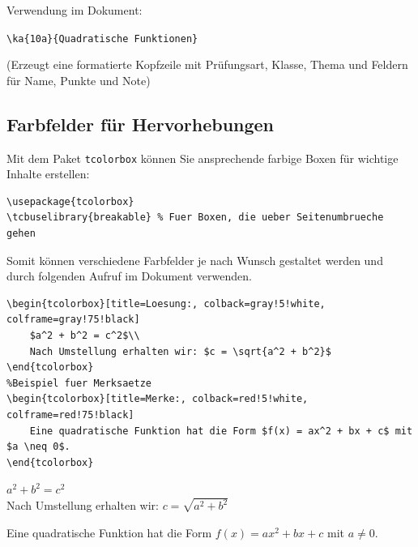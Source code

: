 \begin{ausgabe}
Verwendung im Dokument:

\verb|\ka{10a}{Quadratische Funktionen}|


(Erzeugt eine formatierte Kopfzeile mit Prüfungsart, Klasse, Thema und Feldern für Name, Punkte und Note)
\end{ausgabe}



\subsection{Farbfelder für Hervorhebungen}

Mit dem Paket \texttt{tcolorbox} können Sie ansprechende farbige Boxen für wichtige Inhalte erstellen:

\begin{lstlisting}[style=latex]
\usepackage{tcolorbox}
\tcbuselibrary{breakable} % Fuer Boxen, die ueber Seitenumbrueche gehen
\end{lstlisting}

Somit können verschiedene Farbfelder je nach Wunsch gestaltet werden und durch folgenden Aufruf im Dokument verwenden.

\begin{lstlisting}[style=latex]
%Beispiel fuer eine Loesungsbox
\begin{tcolorbox}[title=Loesung:, colback=gray!5!white, colframe=gray!75!black]
	$a^2 + b^2 = c^2$\\
	Nach Umstellung erhalten wir: $c = \sqrt{a^2 + b^2}$
\end{tcolorbox}
%Beispiel fuer Merksaetze
\begin{tcolorbox}[title=Merke:, colback=red!5!white, colframe=red!75!black]
	Eine quadratische Funktion hat die Form $f(x) = ax^2 + bx + c$ mit $a \neq 0$.
\end{tcolorbox}
\end{lstlisting}

\begin{ausgabe}
\begin{tcolorbox}[title=Lösung:, colback=gray!5!white, colframe=gray!75!black]
	$a^2 + b^2 = c^2$\\
	Nach Umstellung erhalten wir: $c = \sqrt{a^2 + b^2}$
\end{tcolorbox}
\begin{tcolorbox}[title=Merke:, colback=red!5!white, colframe=red!75!black]
	Eine quadratische Funktion hat die Form $f(x) = ax^2 + bx + c$ mit $a \neq 0$.
\end{tcolorbox}
\end{ausgabe}

